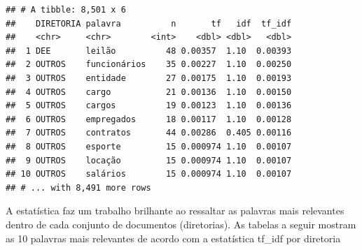 \documentclass[]{article}
\newenvironment{Shaded}{\begin{snugshade}}{\end{snugshade}}
\newcommand{\KeywordTok}[1]{\textcolor[rgb]{0.13,0.29,0.53}{\textbf{#1}}}
\newcommand{\StringTok}[1]{\textcolor[rgb]{0.31,0.60,0.02}{#1}}
\newcommand{\OperatorTok}[1]{\textcolor[rgb]{0.81,0.36,0.00}{\textbf{#1}}}
\newcommand{\NormalTok}[1]{#1}
\begin{document}
\begin{Shaded}
\end{Shaded}

\begin{verbatim}
## # A tibble: 8,501 x 6
##    DIRETORIA palavra          n       tf   idf  tf_idf
##    <chr>     <chr>        <int>    <dbl> <dbl>   <dbl>
##  1 DEE       leilão          48 0.00357  1.10  0.00393
##  2 OUTROS    funcionários    35 0.00227  1.10  0.00250
##  3 OUTROS    entidade        27 0.00175  1.10  0.00193
##  4 OUTROS    cargo           21 0.00136  1.10  0.00150
##  5 OUTROS    cargos          19 0.00123  1.10  0.00136
##  6 OUTROS    empregados      18 0.00117  1.10  0.00128
##  7 OUTROS    contratos       44 0.00286  0.405 0.00116
##  8 OUTROS    esporte         15 0.000974 1.10  0.00107
##  9 OUTROS    locação         15 0.000974 1.10  0.00107
## 10 OUTROS    salários        15 0.000974 1.10  0.00107
## # ... with 8,491 more rows
\end{verbatim}

A estatística faz um trabalho brilhante ao ressaltar as palavras mais
relevantes dentro de cada conjunto de documentos (diretorias). As
tabelas a seguir mostram as 10 palavras mais relevantes de acordo com a
estatística tf\_idf por diretoria

\begin{Shaded}
\end{Shaded}
\end{document}
